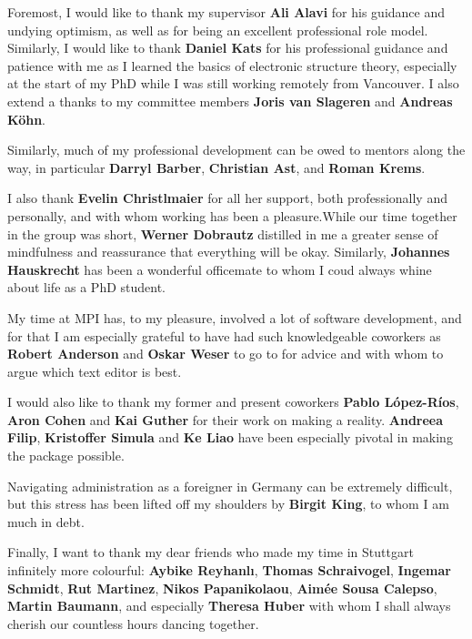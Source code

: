 
Foremost, I would like to thank my supervisor \textbf{Ali Alavi} for his guidance and undying optimism, as well as for being an excellent professional role model. Similarly, I would like to thank \textbf{Daniel Kats} for his professional guidance and patience with me as I learned the basics of electronic structure theory, especially at the start of my PhD while I was still working remotely from Vancouver. I also extend a thanks to my committee members \textbf{Joris van Slageren} and \textbf{Andreas K\"ohn}.

Similarly, much of my professional development can be owed to mentors along the way, in particular \textbf{Darryl Barber}, \textbf{Christian Ast}, and \textbf{Roman Krems}.

I also thank \textbf{Evelin Christlmaier} for all her support, both professionally and personally, and with whom working has been a pleasure.While our time together in the group was short, \textbf{Werner Dobrautz} distilled in me a greater sense of mindfulness and reassurance that everything will be okay. Similarly, \textbf{Johannes Hauskrecht} has been a wonderful officemate to whom I coud always whine about life as a PhD student.

My time at MPI has, to my pleasure, involved a lot of software development, and for that I am especially grateful to have had such knowledgeable coworkers as \textbf{Robert Anderson} and \textbf{Oskar Weser} to go to for advice and with whom to argue which text editor is best.

I would also like to thank my former and present coworkers \textbf{Pablo L\'opez-R\'ios}, \textbf{Aron Cohen} and \textbf{Kai Guther} for their work on making \tchint a reality. \textbf{Andreea Filip}, \textbf{Kristoffer Simula} and \textbf{Ke Liao} have been especially pivotal in making the \pytchint package possible.


Navigating administration as a foreigner in Germany can be extremely difficult, but this stress has been lifted off my shoulders by \textbf{Birgit King}, to whom I am much in debt.


Finally, I want to thank my dear friends who made my time in Stuttgart infinitely more colourful: \textbf{Aybike Reyhanl\i}, \textbf{Thomas Schraivogel}, \textbf{Ingemar Schmidt}, \textbf{Rut Martinez}, \textbf{Nikos Papanikolaou}, \textbf{Aim\'ee Sousa Calepso}, \textbf{Martin Baumann}, and especially \textbf{Theresa Huber} with whom I shall always cherish our countless hours dancing together.
